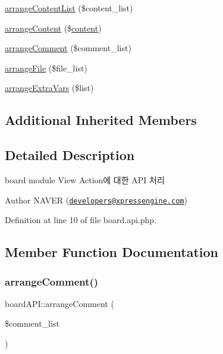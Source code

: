 \begin{DoxyCompactItemize}
\hyperlink{classboardAPI_ade487a5bde6abbc987dbe44f8adf8c22}{arrange\+Content\+List} (\$content\+\_\+list)
\item 
\hyperlink{classboardAPI_a8c3e9522bfba03480917fd7485de99c9}{arrange\+Content} (\$\hyperlink{classcontent}{content})
\item 
\hyperlink{classboardAPI_abf7fe7b5aef6dc0eb6d99cfb96eb5ad1}{arrange\+Comment} (\$comment\+\_\+list)
\item 
\hyperlink{classboardAPI_a01e0faec8a6509f75271f226c9be5004}{arrange\+File} (\$file\+\_\+list)
\item 
\hyperlink{classboardAPI_a80b7a5fb897ce7a42ff20c05f36b6522}{arrange\+Extra\+Vars} (\$list)
\end{DoxyCompactItemize}
\subsection*{Additional Inherited Members}


\subsection{Detailed Description}
board module View Action에 대한 A\+PI 처리 

\begin{DoxyAuthor}{Author}
N\+A\+V\+ER (\href{mailto:developers@xpressengine.com}{\tt developers@xpressengine.\+com}) 
\end{DoxyAuthor}


Definition at line 10 of file board.\+api.\+php.



\subsection{Member Function Documentation}
\hypertarget{classboardAPI_abf7fe7b5aef6dc0eb6d99cfb96eb5ad1}{}\label{classboardAPI_abf7fe7b5aef6dc0eb6d99cfb96eb5ad1} 
\subsubsection{\texorpdfstring{arrange\+Comment()}{arrangeComment()}}
{\footnotesize\ttfamily board\+A\+P\+I\+::arrange\+Comment (\begin{DoxyParamCaption}\item[{}]{\$comment\+\_\+list }\end{DoxyParamCaption})}



